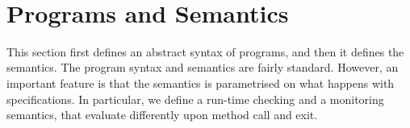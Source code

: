 \
\section{Programs and Semantics}\label{SecProgram}

This section first defines an abstract syntax of programs, and then it
defines the semantics. The program syntax and semantics are fairly
standard. However, an important feature is that the semantics is
parametrised on what happens with specifications. In particular, we
define a run-time checking and a monitoring semantics, that evaluate
differently upon method call and exit. 


